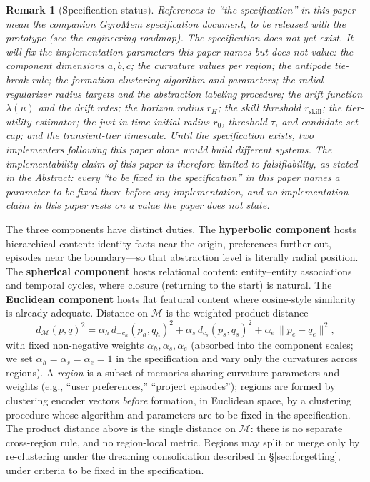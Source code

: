 \documentclass[11pt,a4paper]{article}
\newtheorem{remark}{Remark}
\newcommand{\M}{\mathcal{M}}
\begin{document}
\begin{remark}[Specification status]
References to ``the specification'' in this paper mean the companion
GyroMem specification document, to be released with the prototype (see
the engineering roadmap). The specification does not yet exist. It will
fix the implementation parameters this paper names but does not value:
the component dimensions $a, b, c$; the curvature values per region; the
antipode tie-break rule; the formation-clustering algorithm and
parameters; the radial-regularizer radius targets and the abstraction
labeling procedure; the drift function $\lambda(u)$ and the drift rates;
the horizon radius $r_H$; the skill threshold
$r_{\mathrm{skill}}$; the tier-utility estimator; the just-in-time
initial radius $r_0$, threshold $\tau$, and candidate-set cap; and the
transient-tier timescale. Until the specification exists, two
implementers following this paper alone would build different systems.
The implementability claim of this paper is therefore limited to
falsifiability, as stated in the Abstract: every ``to be fixed in the
specification'' in this paper names a parameter to be fixed there before
any implementation, and no implementation claim in this paper rests on a
value the paper does not state.
\end{remark}

The three components have distinct duties. The \textbf{hyperbolic
component} hosts hierarchical content: identity facts near the origin,
preferences further out, episodes near the boundary---so that abstraction
level is literally radial position. The \textbf{spherical component}
hosts relational content: entity--entity associations and temporal cycles,
where closure (returning to the start) is natural. The \textbf{Euclidean
component} hosts flat featural content where cosine-style similarity is
already adequate. Distance on $\M$ is the weighted product distance
\begin{equation}
d_{\M}(p, q)^2 = \alpha_h\, d_{-c_h}(p_h, q_h)^2 + \alpha_s\, d_{c_s}(p_s, q_s)^2 + \alpha_e\, \|p_e - q_e\|^2,
\end{equation}
with fixed non-negative weights $\alpha_h, \alpha_s, \alpha_e$ (absorbed
into the component scales; we set $\alpha_h = \alpha_s = \alpha_e = 1$ in
the specification and vary only the curvatures across regions).
A \emph{region} is a subset of memories sharing curvature parameters and
weights (e.g., ``user preferences,'' ``project episodes''); regions are
formed by clustering encoder vectors \emph{before} formation, in Euclidean
space, by a clustering procedure whose algorithm and parameters are to be fixed
in the specification. The product distance above is the single distance
on $\M$: there is no separate cross-region rule, and no region-local
metric. Regions may split or merge only by re-clustering under the
dreaming consolidation described in \S\ref{sec:forgetting}, under criteria
to be fixed in the specification.
\end{document}
